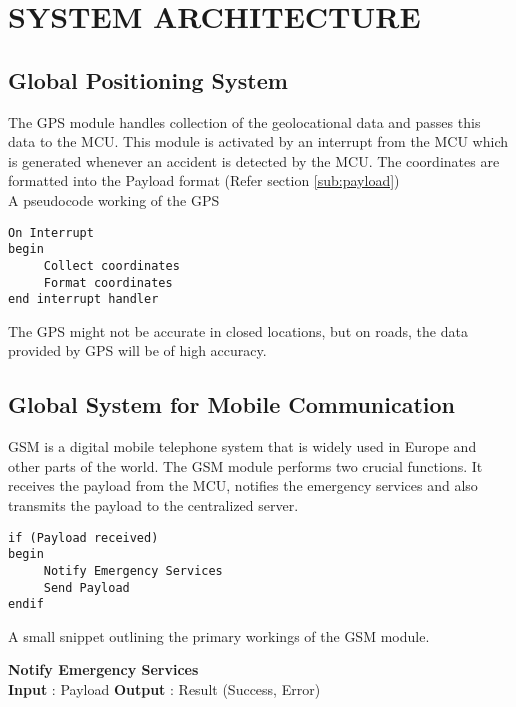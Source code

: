 \chapter{SYSTEM ARCHITECTURE} %

\section{Global Positioning System}

The GPS module handles collection of the geolocational data and passes this data to the MCU. This module is activated by an interrupt from the MCU which is generated whenever an accident is detected by the MCU. The coordinates are formatted into the Payload format (Refer section \ref{sub:payload}) \\



\noindent A pseudocode working of the GPS \\

\begin{verbatim}
On Interrupt
begin
     Collect coordinates
     Format coordinates
end interrupt handler
\end{verbatim}

The GPS might not be accurate in closed locations, but on roads, the data provided by GPS will be of high accuracy.

\section{Global System for Mobile Communication}

GSM is a digital mobile telephone system that is widely used in Europe and other parts of the world. The GSM module performs two crucial functions. It receives the payload from the MCU, notifies the emergency services and also transmits the payload to the centralized server.

\begin{verbatim}
if (Payload received)
begin
     Notify Emergency Services
     Send Payload
endif
\end{verbatim}

A small snippet outlining the primary workings of the GSM module.

\noindent\textbf{Notify Emergency Services} \\
\noindent\textbf{Input} : Payload \newline
\textbf{Output} : Result (Success, Error)

